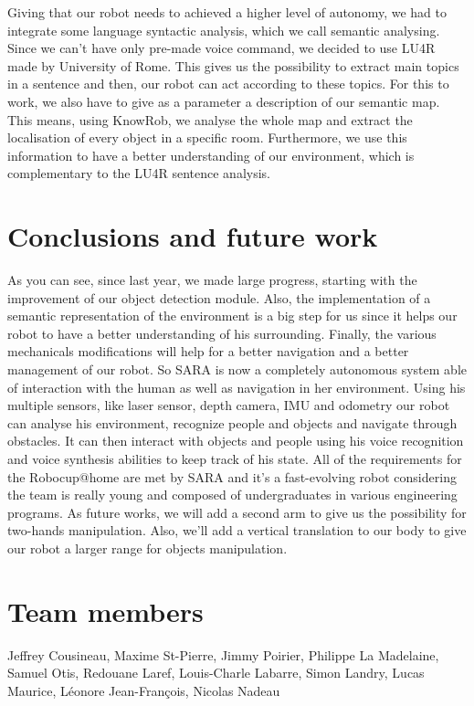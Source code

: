 \documentclass[runningheads,a4paper]{llncs}
\begin{document}
Giving that our robot needs to achieved a higher level of autonomy, we had to integrate some language syntactic analysis, which we call semantic analysing. Since we can't have only pre-made voice command, we decided to use LU4R \cite{lu4r} made by University of Rome. This gives us the possibility to extract main topics in a sentence and then, our robot can act according to these topics. For this to work, we also have to give as a parameter a description of our semantic map. This means, using KnowRob, we analyse the whole map and extract the localisation of every object in a specific room. Furthermore, we use this information to have a better understanding of our environment, which is complementary to the LU4R sentence analysis.


\section{Conclusions and future work}
\tab As you can see, since last year, we made large progress, starting with the improvement of our object detection module. Also, the implementation of a semantic representation of the environment is a big step for us since it helps our robot to have a better understanding of his surrounding. Finally, the various mechanicals modifications will help for a better navigation and a better management of our robot. So SARA is now a completely autonomous system able of interaction with the human as well as navigation in her environment. Using his multiple sensors, like laser sensor, depth camera, IMU and odometry our robot can analyse his environment, recognize people and objects and navigate through obstacles. It can then interact with objects and people using his voice recognition and voice synthesis abilities to keep track of his state. All of the requirements for the Robocup@home are met by SARA and it's a fast-evolving robot considering the team is really young and composed of undergraduates in various engineering programs. As future works, we will add a second arm to give us the possibility for two-hands manipulation. Also, we'll add a vertical translation to our body to give our robot a larger range for objects manipulation.


	
\section*{Team members}
Jeffrey Cousineau, Maxime St-Pierre, Jimmy Poirier, Philippe La Madelaine, Samuel Otis, Redouane Laref, Louis-Charle Labarre, Simon Landry, Lucas Maurice, Léonore Jean-François, Nicolas Nadeau

\nocite{*}


\end{document}
